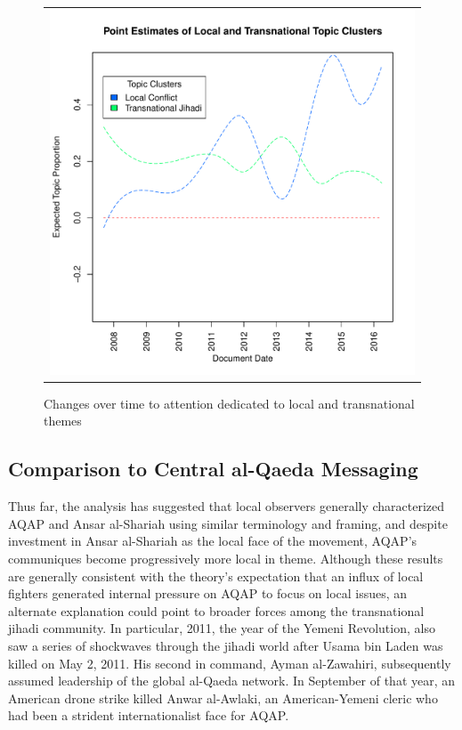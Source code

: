 \begin{figure}
\begin{center}
\begin{tabular}{c}
  \includegraphics[width=5.00in]{./Pictures/localtranscluster.pdf}\\
\end{tabular}
\caption{Changes over time to attention dedicated to local and transnational themes }
\label{fig:l-t-clusters}
\end{center}
 \end{figure}

\subsection{Comparison to Central al-Qaeda Messaging}
\label{sec:STM3}
Thus far, the analysis has suggested that local observers generally
characterized AQAP and Ansar al-Shariah using similar terminology and
framing, and despite investment in Ansar al-Shariah as the local face of the movement, AQAP's communiques become progressively
more local in theme.  Although these results are generally
consistent with the theory's expectation that an influx
of local fighters generated internal pressure on AQAP to focus on
local issues, an alternate explanation could point to broader forces
among the transnational jihadi community. In particular, 2011, the year of
the Yemeni Revolution, also saw a series of shockwaves through the
jihadi world after Usama bin Laden was killed on May 2, 2011. His second in command,
Ayman al-Zawahiri, subsequently assumed leadership of the global
al-Qaeda network. In September of that year, an American drone strike
killed Anwar al-Awlaki, an American-Yemeni cleric who had been a
strident internationalist face for AQAP.

